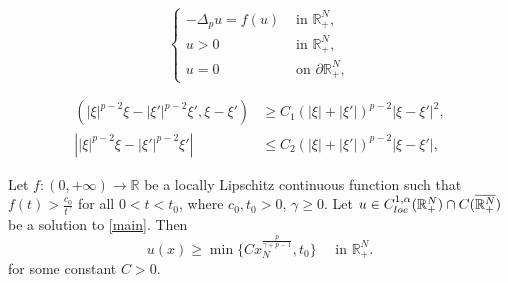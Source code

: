 \documentclass[10pt,a4paper]{amsart}
\begin{document}
	\begin{equation}\label{main}
		\begin{cases}
			-\Delta_p u = f(u) & \text{ in } \mathbb{R}^N_+,\\
			u>0 & \text{ in } \mathbb{R}^N_+,\\
			u=0 & \text{ on } \partial\mathbb{R}^N_+,
		\end{cases}
	\end{equation}

	\begin{align}
		(|\xi|^{p-2}\xi - |\xi'|^{p-2}\xi', \xi -\xi') &\ge C_1 (|\xi| + |\xi'|)^{p-2} |\xi -\xi'|^2, \label{p_ge}\\
		\left||\xi|^{p-2}\xi - |\xi'|^{p-2}\xi'\right| &\le C_2 (|\xi| + |\xi'|)^{p-2} |\xi -\xi'|, \label{p_le}
	\end{align}

	\begin{lemma}\label{lem:lower_bound}
		Let $f:(0,+\infty)\to\mathbb{R}$ be a locally Lipschitz continuous function such that $f(t) > \frac{c_0}{t^\gamma}$ for all $0<t<t_0$, where $c_0,t_0>0$, $\gamma\ge0$. Let $u \in C^{1,\alpha}_{\rm loc}(\mathbb{R}^N_+) \cap C(\overline{\mathbb{R}^N_+})$ be a solution to \eqref{main}. Then
		\[
		u(x) \ge \min\{C x_N^\frac{p}{\gamma+p-1}, t_0\} \quad\text{ in } \mathbb{R}^N_+.
		\]
		for some constant $C>0$.
	\end{lemma}
\end{document}
